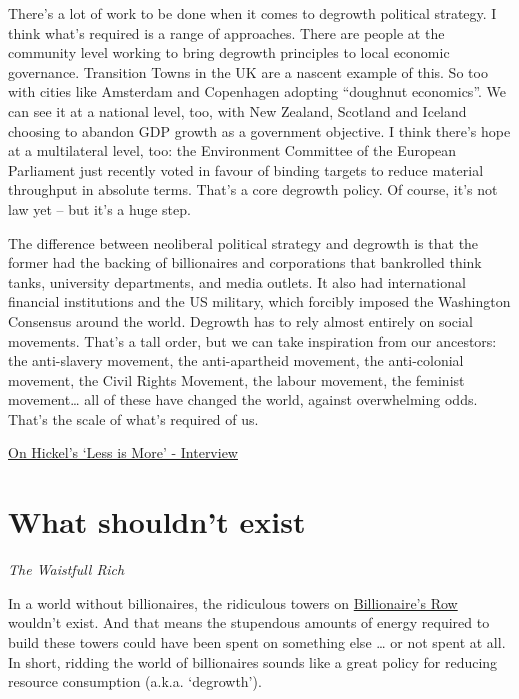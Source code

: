 \documentclass[
]{book}
\begin{document}
There's a lot of work to be done when it comes to degrowth political strategy. I think what's required is a range of approaches. There are people at the community level working to bring degrowth principles to local economic governance. Transition Towns in the UK are a nascent example of this. So too with cities like Amsterdam and Copenhagen adopting ``doughnut economics''. We can see it at a national level, too, with New Zealand, Scotland and Iceland choosing to abandon GDP growth as a government objective. I think there's hope at a multilateral level, too: the Environment Committee of the European Parliament just recently voted in favour of binding targets to reduce material throughput in absolute terms. That's a core degrowth policy. Of course, it's not law yet -- but it's a huge step.

The difference between neoliberal political strategy and degrowth is that the former had the backing of billionaires and corporations that bankrolled think tanks, university departments, and media outlets. It also had international financial institutions and the US military, which forcibly imposed the Washington Consensus around the world. Degrowth has to rely almost entirely on social movements. That's a tall order, but we can take inspiration from our ancestors: the anti-slavery movement, the anti-apartheid movement, the anti-colonial movement, the Civil Rights Movement, the labour movement, the feminist movement\ldots{} all of these have changed the world, against overwhelming odds. That's the scale of what's required of us.

\href{https://www.the-trouble.com/content/2021/2/11/ecosocialism-is-the-horizon-degrowth-is-the-way}{On Hickel's `Less is More' - Interview}

\hypertarget{what-shouldnt-exist}{%
\section{What shouldn't exist}\label{what-shouldnt-exist}}

\emph{The Waistfull Rich}

In a world without billionaires, the ridiculous towers on
\href{https://dyrehaugen.github.io/rurb/high-rise-building.html}{Billionaire's Row} wouldn't exist.
And that means the stupendous amounts of energy required to build these towers
could have been spent on something else \ldots{} or not spent at all.
In short, ridding the world of billionaires sounds like a
great policy for reducing resource consumption (a.k.a. `degrowth').
\end{document}

